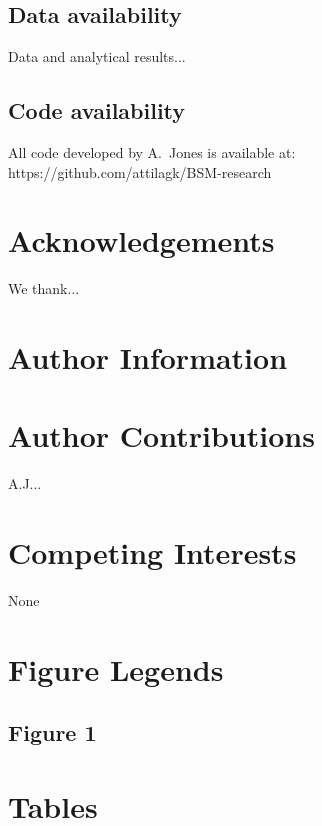 \documentclass[letterpaper]{article}
\begin{document}
\subsection*{Data availability}

Data and analytical results...

\subsection*{Code availability}

All code developed by A.~Jones is available at:\\
https://github.com/attilagk/BSM-research


%


\section*{Acknowledgements}

We thank...

\section*{Author Information}

\section*{Author Contributions}

A.J...

\section*{Competing Interests}

None

\section*{Figure Legends}

\subsection*{Figure 1}

\section*{Tables}
\end{document}
